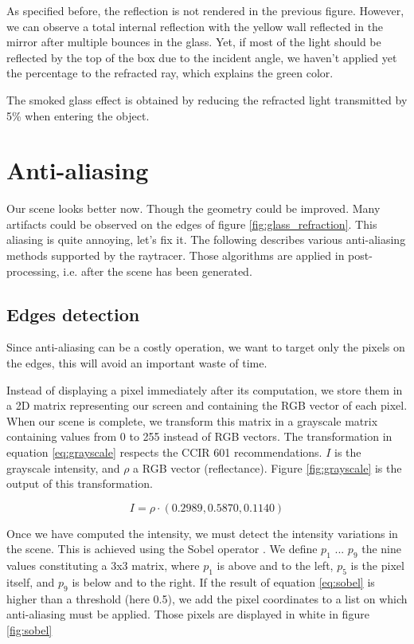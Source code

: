 As specified before, the reflection is not rendered in the previous figure. However, we can observe a total internal reflection with the yellow wall reflected in the mirror after multiple bounces in the glass. Yet, if most of the light should be reflected by the top of the box due to the incident angle, we haven't applied yet the percentage to the refracted ray, which explains the green color.

The smoked glass effect is obtained by reducing the refracted light transmitted by 5\% when entering the object.


\section{Anti-aliasing}
Our scene looks better now. Though the geometry could be improved. Many artifacts could be observed on the edges of figure \ref{fig:glass_refraction}. This aliasing is quite annoying, let's fix it. The following describes various anti-aliasing methods supported by the raytracer. Those algorithms are applied in post-processing, i.e. after the scene has been generated.

\subsection{Edges detection}
Since anti-aliasing can be a costly operation, we want to target only the pixels on the edges, this will avoid an important waste of time.

Instead of displaying a pixel immediately after its computation, we store them in a 2D matrix representing our screen and containing the RGB vector of each pixel. When our scene is complete, we transform this matrix in a grayscale matrix containing values from 0 to 255 instead of RGB vectors. The transformation in equation \ref{eq:grayscale} respects the CCIR 601 recommendations. $I$ is the grayscale intensity, and $\rho$ a RGB vector (reflectance). Figure \ref{fig:grayscale} is the output of this transformation.

\begin{equation}
I = \rho \cdot (0.2989, 0.5870, 0.1140)
\label{eq:grayscale}
\end{equation}

Once we have computed the intensity, we must detect the intensity variations in the scene. This is achieved using the Sobel operator \cite{sobel19683x3}. We define $p_1$ ... $p_9$ the nine values constituting a 3x3 matrix, where $p_1$ is above and to the left, $p_5$ is the pixel itself, and $p_9$ is below and to the right. If the result of equation \ref{eq:sobel} is higher than a threshold (here 0.5), we add the pixel coordinates to a list on which anti-aliasing must be applied. Those pixels are displayed in white in figure \ref{fig:sobel}

